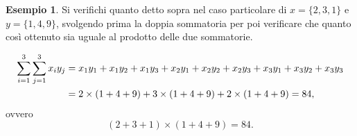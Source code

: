 \documentclass[
]{memoir}
\theoremstyle{definition}
\theoremstyle{definition}
\newtheorem{example}{Esempio}[chapter]
\theoremstyle{definition}
\theoremstyle{definition}
\theoremstyle{remark}
\begin{document}
\begin{example}
Si verifichi quanto detto sopra nel caso particolare di \(x = \{2, 3, 1\}\) e \(y = \{1, 4, 9\}\), svolgendo prima la doppia sommatoria per poi verificare che quanto così ottenuto sia uguale al prodotto delle due sommatorie.

\begin{align}
\sum_{i=1}^3 \sum_{j=1}^3 x_i y_j &= x_1y_1 + x_1y_2 + x_1y_3 + 
x_2y_1 + x_2y_2 + x_2y_3 + 
x_3y_1 + x_3y_2 + x_3y_3 \notag\\
&= 2 \times (1+4+9) + 3 \times (1+4+9) + 2 \times (1+4+9) = 84,\notag
\end{align}
ovvero
\[
(2 + 3 + 1) \times (1+4+9) = 84.
\]
\end{example}

  
\end{document}
